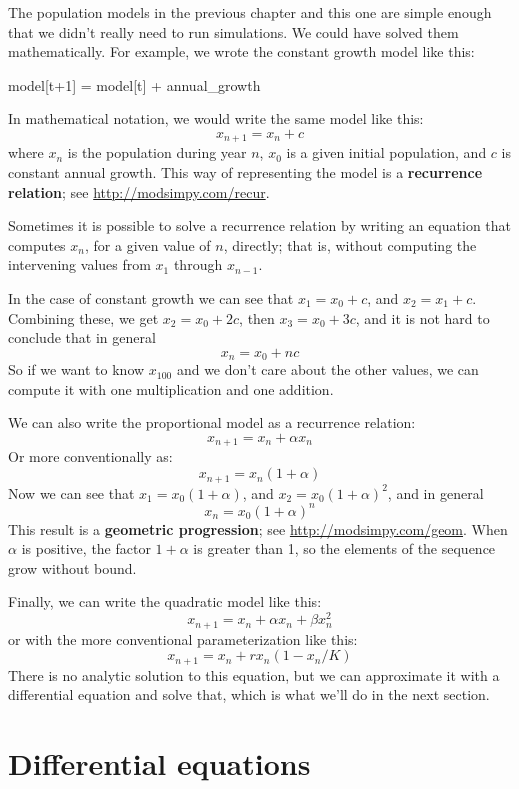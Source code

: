 \documentclass[12pt]{book}
\theoremstyle{exercise}
\begin{document}
The population models in the previous chapter and this one are simple enough that we didn't really need to run simulations.  We could have solved them mathematically.  For example, we wrote the constant growth model like this:

\begin{python}
model[t+1] = model[t] + annual_growth
\end{python}

In mathematical notation, we would write the same model like this:
%
\[ x_{n+1} = x_n + c \]
%
where $x_n$ is the population during year $n$, $x_0$ is a given initial population, and $c$ is constant annual growth.  This way of representing the model is a {\bf recurrence relation}; see \url{http://modsimpy.com/recur}.


Sometimes it is possible to solve a recurrence relation by writing an equation that computes $x_n$, for a given value of $n$, directly; that is, without computing the intervening values from $x_1$ through $x_{n-1}$.

In the case of constant growth we can see that $x_1 = x_0 + c$, and $x_2 = x_1 + c$.  Combining these, we get $x_2 = x_0 + 2c$, then $x_3 = x_0 + 3c$, and it is not hard to conclude that in general
%
\[ x_n = x_0 + nc \]
%
So if we want to know $x_{100}$ and we don't care about the other values, we can compute it with one multiplication and one addition.

We can also write the proportional model as a recurrence relation:
%
\[ x_{n+1} = x_n + \alpha x_n \]
%
Or more conventionally as:
%
\[ x_{n+1} = x_n (1 + \alpha) \]
%
Now we can see that $x_1 = x_0 (1 + \alpha)$, and $x_2 = x_0 (1 + \alpha)^2$, and in general
%
\[ x_n = x_0 (1 + \alpha)^n \]
%
This result is a {\bf geometric progression}; see \url{http://modsimpy.com/geom}.  When $\alpha$ is positive, the factor $1+\alpha$ is greater than 1, so the elements of the sequence grow without bound.


Finally, we can write the quadratic model like this:
%
\[ x_{n+1} = x_n + \alpha x_n + \beta x_n^2 \]
%
or with the more conventional parameterization like this:
%
\[ x_{n+1} = x_n + r x_n (1 - x_n / K) \]
%
There is no analytic solution to this equation, but we can approximate it with a differential equation and solve that, which is what we'll do in the next section.


\section{Differential equations}
\label{diffeq}
\end{document}
